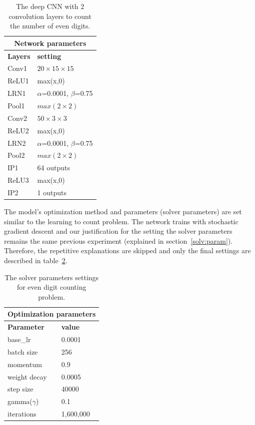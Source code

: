 \begin{table}[H]
	\centering
			\caption{The deep CNN with 2 convolution layers to count the number of even digits.}
	\begin{tabular}{ |p{2cm}|p{2cm}| }
	\hline 
	\multicolumn{2}{|c|}{\textbf{Network parameters}} \\
	\hline
	\hline
	\textbf{Layers} & \textbf{setting }\\
	\hline
	Conv1 & $20\times15\times15$\\
	\hline
	ReLU1 & max(x,0)  \\
	\hline
	LRN1 & $\alpha$=0.0001, $\beta$=0.75\\
	\hline
	Pool1    & $max(2\times2)$ \\
	\hline
	Conv2 & $50\times3\times3$\\
	\hline
	ReLU2 & max(x,0)  \\
	\hline
	LRN2 & $\alpha$=0.0001, $\beta$=0.75\\
	\hline
	Pool2    & $max(2\times2)$ \\
	\hline
	IP1 & 64 outputs \\
	\hline
	ReLU3 & max(x,0)  \\
	\hline
	IP2 & 1 outputs \\
	\hline
	\end{tabular}
		\label{tab:ucsdnet}
\end{table}

The model's optimization method and parameters (solver parameters) are set similar to the learning to count problem. The network trains with stochastic gradient descent and our justification for the setting the solver parameters remains the same previous experiment (explained in section~\ref{solv:param}). Therefore, the repetitive explanations are skipped and only the final settings are described in table~\ref{tab:solvparam}.

\begin{table}[H]
	\centering
			\caption{The solver parameters settings for even digit counting problem.}
	\begin{tabular}{ |p{2cm}|p{2cm}| }
	\hline 
	\multicolumn{2}{|c|}{\textbf{Optimization parameters}} \\
	\hline
	\hline
	\textbf{Parameter} & \textbf{value}\\
	\hline
	base\_lr & 0.0001\\
	\hline
	batch size & 256\\
	\hline
	momentum & 0.9  \\
	\hline
	weight decay & 0.0005\\
	\hline
	step size   & 40000 \\
	\hline
	gamma($\gamma$) & 0.1\\
	\hline
	iterations & 1,600,000\\
	\hline
	\end{tabular}

		\label{tab:solvparam}
\end{table}

